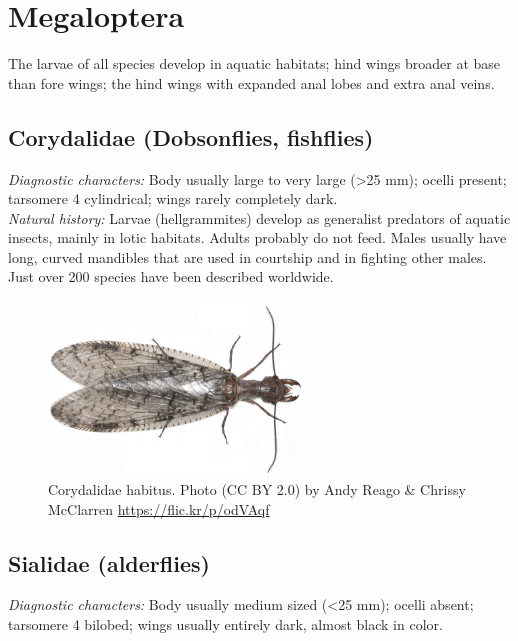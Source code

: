 \documentclass[letterpaper, 11pt]{article}
\begin{document}
\section{Megaloptera}
The larvae of all species develop in aquatic habitats;
 hind wings broader at base than fore wings; the hind wings with expanded anal lobes and extra anal veins.\\

\subsection{Corydalidae (Dobsonflies, fishflies)}

\noindent{}\textit{Diagnostic characters:} Body usually large to very large (\textgreater25 mm); ocelli present; tarsomere 4 cylindrical; wings rarely completely dark.\\

\noindent{}\textit{Natural history:} Larvae (hellgrammites) develop as generalist predators of aquatic insects, mainly in lotic habitats. Adults probably do not feed. Males usually have long, curved mandibles that are used in courtship and in fighting other males. Just over 200 species have been described worldwide.\\

\begin{figure}[ht!]
  \centering
    \includegraphics[width=0.6\textwidth]{figures/CorydalidHabitus}
\caption{Corydalidae habitus. Photo (CC BY 2.0) by Andy Reago \& Chrissy McClarren \url{https://flic.kr/p/odVAqf}}
  \label{fig:corydalid}
\end{figure}

\subsection{Sialidae (alderflies)}
\noindent{}\textit{Diagnostic characters:} Body usually medium sized (\textless25 mm); ocelli absent; tarsomere 4 bilobed; wings usually entirely dark, almost black in color.\\
\end{document}
